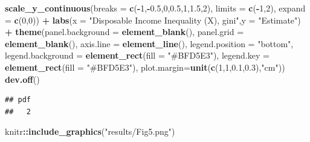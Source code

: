 \documentclass[
]{article}
\newenvironment{Shaded}{\begin{snugshade}}{\end{snugshade}}
\newcommand{\DataTypeTok}[1]{\textcolor[rgb]{0.13,0.29,0.53}{#1}}
\newcommand{\DecValTok}[1]{\textcolor[rgb]{0.00,0.00,0.81}{#1}}
\newcommand{\FloatTok}[1]{\textcolor[rgb]{0.00,0.00,0.81}{#1}}
\newcommand{\KeywordTok}[1]{\textcolor[rgb]{0.13,0.29,0.53}{\textbf{#1}}}
\newcommand{\NormalTok}[1]{#1}
\newcommand{\OperatorTok}[1]{\textcolor[rgb]{0.81,0.36,0.00}{\textbf{#1}}}
\newcommand{\StringTok}[1]{\textcolor[rgb]{0.31,0.60,0.02}{#1}}
\begin{document}
\begin{Shaded}
\begin{Highlighting}[]
\StringTok{  }\KeywordTok{scale_y_continuous}\NormalTok{(}\DataTypeTok{breaks =} \KeywordTok{c}\NormalTok{(}\OperatorTok{-}\DecValTok{1}\NormalTok{,}\OperatorTok{-}\FloatTok{0.5}\NormalTok{,}\DecValTok{0}\NormalTok{,}\FloatTok{0.5}\NormalTok{,}\DecValTok{1}\NormalTok{,}\FloatTok{1.5}\NormalTok{,}\DecValTok{2}\NormalTok{), }\DataTypeTok{limits =} \KeywordTok{c}\NormalTok{(}\OperatorTok{-}\DecValTok{1}\NormalTok{,}\DecValTok{2}\NormalTok{), }\DataTypeTok{expand =} \KeywordTok{c}\NormalTok{(}\DecValTok{0}\NormalTok{,}\DecValTok{0}\NormalTok{)) }\OperatorTok{+}
\StringTok{  }\KeywordTok{labs}\NormalTok{(}\DataTypeTok{x =} \StringTok{"Disposable Income Inequality (X), gini"}\NormalTok{,}\DataTypeTok{y =} \StringTok{"Estimate"}\NormalTok{) }\OperatorTok{+}
\StringTok{  }\KeywordTok{theme}\NormalTok{(}\DataTypeTok{panel.background =} \KeywordTok{element_blank}\NormalTok{(),}
        \DataTypeTok{panel.grid =} \KeywordTok{element_blank}\NormalTok{(),}
        \DataTypeTok{axis.line =} \KeywordTok{element_line}\NormalTok{(),}
        \DataTypeTok{legend.position =} \StringTok{"bottom"}\NormalTok{,}
        \DataTypeTok{legend.background =} \KeywordTok{element_rect}\NormalTok{(}\DataTypeTok{fill =} \StringTok{"#BFD5E3"}\NormalTok{),}
        \DataTypeTok{legend.key =} \KeywordTok{element_rect}\NormalTok{(}\DataTypeTok{fill =} \StringTok{"#BFD5E3"}\NormalTok{),}
        \DataTypeTok{plot.margin=}\KeywordTok{unit}\NormalTok{(}\KeywordTok{c}\NormalTok{(}\DecValTok{1}\NormalTok{,}\DecValTok{1}\NormalTok{,}\FloatTok{0.1}\NormalTok{,}\FloatTok{0.3}\NormalTok{),}\StringTok{"cm"}\NormalTok{))}
\KeywordTok{dev.off}\NormalTok{()}
\end{Highlighting}
\end{Shaded}

\begin{verbatim}
## pdf 
##   2
\end{verbatim}

\begin{Shaded}
\begin{Highlighting}[]
\NormalTok{knitr}\OperatorTok{::}\KeywordTok{include_graphics}\NormalTok{(}\StringTok{"results/Fig5.png"}\NormalTok{)}
\end{Highlighting}
\end{Shaded}
\end{document}

